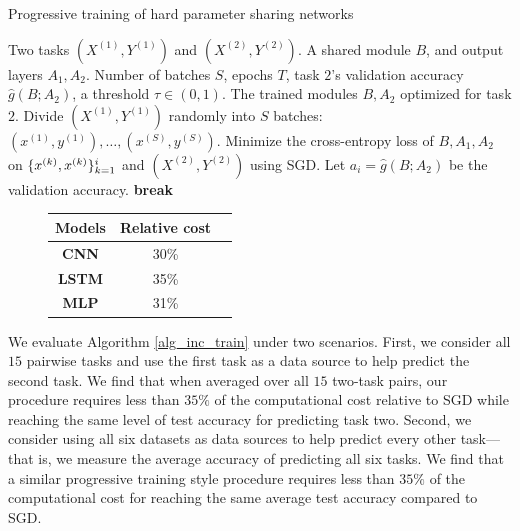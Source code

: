 \begin{algorithm}[!h]
	\caption{Progressive training of hard parameter sharing networks}
	\label{alg_inc_train}
	\begin{algorithmic}[1]
		\Input Two tasks $(X^{(1)}, Y^{(1)})$ and $(X^{(2)}, Y^{(2)})$.
		\Param A shared module $B$, and output layers $A_1, A_2$.
		\Req Number of batches $S$, epochs $T$, task $2$'s validation accuracy $\hat{g}(B; A_2)$, a threshold $\tau\in(0,1)$.
		\Output The trained modules $B, A_2$ optimized for task $2$.
		\State Divide $(X^{(1)}, Y^{(1)})$ randomly into $S$ batches: $(x^{(1)}, y^{(1)}), \dots, (x^{(S)}, y^{(S)})$.
		\State Minimize the cross-entropy loss of $B, A_1, A_2$ on $\{x^{(k)}, x^{(k)}\}_{k=1}^i$ and  $(X^{(2)}, Y^{(2)})$ using SGD.
		\EndFor
		\State Let $a_i = \hat{g}(B; A_2)$ be the validation accuracy.
		\State \textbf{break}
		\EndIf
		\EndFor
	\end{algorithmic}
\end{algorithm}


\begin{figure}
	\vspace{0.0in}
	\centering
	\begin{tabular}{c c c}
		\toprule
		Models & Relative cost \\
		\midrule
		{\bf CNN}  & 30\% \\
		{\bf LSTM} & 35\% \\
		{\bf MLP}  & 31\%  \\
		\bottomrule
		\end{tabular}
		\label{tab:taskonomy}
	\label{fig_intro_arch}
\end{figure}
We evaluate Algorithm \ref{alg_inc_train} under two scenarios.
First, we consider all $15$ pairwise tasks and use the first task as a data source to help predict the second task.
We find that when averaged over all $15$ two-task pairs, our procedure requires less than $35\%$ of the computational cost relative to SGD while reaching the same level of test accuracy for predicting task two.
Second, we consider using all six datasets as data sources to help predict every other task---that is, we measure the average accuracy of predicting all six tasks.
We find that a similar progressive training style procedure requires less than $35\%$ of the computational cost for reaching the same average test accuracy compared to SGD.


